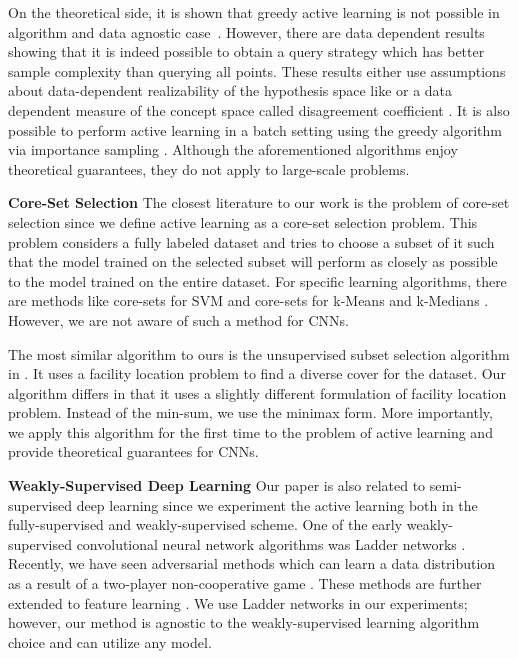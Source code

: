 \documentclass{article} %
\begin{document}
On the theoretical side, it is shown that greedy active learning is not possible in algorithm and data agnostic case~\citep{NIPS2004_2636}. However, there are data dependent results showing that it is indeed possible to obtain a query strategy which has better sample complexity than querying all points. These results either use assumptions about data-dependent realizability of the hypothesis space like \citep{gonen2013efficient} or a data dependent measure of the concept space called disagreement coefficient \citep{hanneke2007bound}. It is also possible to perform active learning in a batch setting using the greedy algorithm via importance sampling \citep{ganti2012upal}. Although the aforementioned algorithms enjoy theoretical guarantees, they do not apply to large-scale problems.

\noindent\textbf{Core-Set Selection} The closest literature to our
work is the problem of core-set selection since we define active learning as a
core-set selection problem. This problem considers a
fully labeled dataset and tries to choose a subset of it such that the model
trained on the selected subset will perform as closely as possible to the model
trained on the entire dataset. For specific learning algorithms, there are
methods like core-sets for SVM \citep{tsang2005core} and core-sets for k-Means
and k-Medians \citep{har2005smaller}. However, we are not aware of such a method for CNNs.

The most similar algorithm to ours is the unsupervised subset selection
algorithm in \citep{wei2013using}. It uses a facility location problem
to find a diverse cover for the dataset. Our algorithm differs in that it uses a
slightly different formulation of facility location problem. Instead of the
min-sum, we use the minimax \citep{facility} form. More
importantly, we apply this algorithm for the first time to the problem of active
learning and provide theoretical guarantees for CNNs.
 
\noindent\textbf{Weakly-Supervised Deep Learning} Our paper is also related to
semi-supervised deep learning since we experiment the active learning both in
the fully-supervised and weakly-supervised scheme. One of the early
weakly-supervised convolutional neural network algorithms was Ladder networks
\citep{ladder}. Recently, we have seen adversarial methods which can learn a data
distribution as a result of a two-player non-cooperative game
\citep{salimans2016improved, gan_original, dcgan}. These methods are further
extended to feature learning \citep{ali, bigan}. We use Ladder networks in our
experiments; however, our method is agnostic to the weakly-supervised learning algorithm choice and can
utilize any model.
\end{document}
